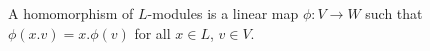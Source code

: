 A homomorphism of $L$-modules is a linear map $\phi: V \rightarrow W$ such that $\phi(x.v) = x.\phi(v)$ for all $x \in L$, $v \in V$.
